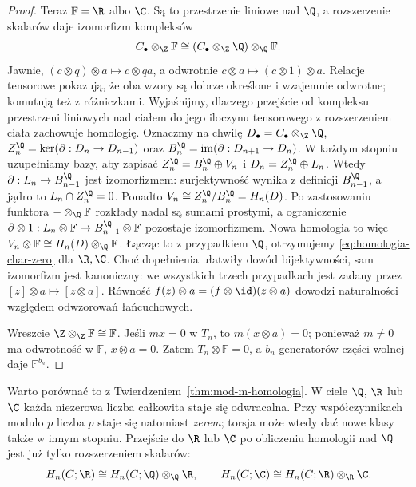 \begin{proof}
Teraz $\mathbb F=\R$ albo $\C$.
Są to przestrzenie liniowe nad $\Q$, a
rozszerzenie skalarów daje izomorfizm
kompleksów
\[
 C_\bullet\otimes_{\Z}\mathbb F
 \cong (C_\bullet\otimes_{\Z}\Q)
             \otimes_{\Q}\mathbb F.
\]
Jawnie, $(c\otimes q)\otimes a\mapsto c\otimes qa$,
a odwrotnie $c\otimes a\mapsto(c\otimes1)\otimes a$.
Relacje tensorowe pokazują, że oba wzory są dobrze określone
i wzajemnie odwrotne; komutują też z różniczkami.
Wyjaśnijmy, dlaczego przejście od kompleksu
przestrzeni liniowych nad ciałem do jego iloczynu tensorowego
z rozszerzeniem ciała zachowuje homologię. Oznaczmy na chwilę
$D_\bullet=C_\bullet\otimes_{\Z}\Q$,
$Z_n^\Q=\ker(\partial:D_n\to D_{n-1})$
oraz $B_n^\Q=\operatorname{im}(\partial:D_{n+1}\to D_n)$.
W każdym stopniu uzupełniamy bazy, aby zapisać
$Z_n^\Q=B_n^\Q\oplus V_n$ i
$D_n=Z_n^\Q\oplus L_n$.
Wtedy $\partial:L_n\to B_{n-1}^\Q$ jest
izomorfizmem: surjektywność wynika z definicji
$B_{n-1}^\Q$, a jądro to
$L_n\cap Z_n^\Q=0$. Ponadto
$V_n\cong Z_n^\Q/B_n^\Q=H_n(D)$.
Po zastosowaniu funktora $-\otimes_{\Q}\mathbb F$
rozkłady nadal są sumami prostymi, a ograniczenie
$\partial\otimes1:L_n\otimes\mathbb F
\to B_{n-1}^\Q\otimes\mathbb F$ pozostaje
izomorfizmem. Nowa homologia to więc
$V_n\otimes\mathbb F
\cong H_n(D)\otimes_{\Q}\mathbb F$.
Łącząc to z przypadkiem $\Q$, otrzymujemy
\eqref{eq:homologia-char-zero} dla $\R,\C$.
Choć dopełnienia ułatwiły dowód bijektywności, sam izomorfizm
jest kanoniczny: we wszystkich trzech przypadkach jest zadany
przez $[z]\otimes a\mapsto[z\otimes a]$.
Równość $f(z)\otimes a=(f\otimes\id)(z\otimes a)$ dowodzi
naturalności względem odwzorowań łańcuchowych.

Wreszcie $\Z\otimes_{\Z}\mathbb F\cong\mathbb F$.
Jeśli $mx=0$ w $T_n$, to
$m(x\otimes a)=0$; ponieważ $m\ne0$
ma odwrotność w $\mathbb F$,
$x\otimes a=0$. Zatem $T_n\otimes\mathbb F=0$,
a $b_n$ generatorów części wolnej daje
$\mathbb F^{b_n}$.
\end{proof}

Warto porównać to z Twierdzeniem~\ref{thm:mod-m-homologia}.
W ciele $\Q$, $\R$ lub $\C$ każda niezerowa
liczba całkowita staje się odwracalna.
Przy współczynnikach modulo $p$ liczba $p$
staje się natomiast \emph{zerem}; torsja
może wtedy dać nowe klasy także w innym stopniu.
Przejście do $\R$ lub $\C$ po obliczeniu
homologii nad $\Q$ jest już tylko
rozszerzeniem skalarów:
\[
 H_n(C;\R)\cong H_n(C;\Q)\otimes_{\Q}\R,
 \qquad
 H_n(C;\C)\cong H_n(C;\R)\otimes_{\R}\C.
\]

